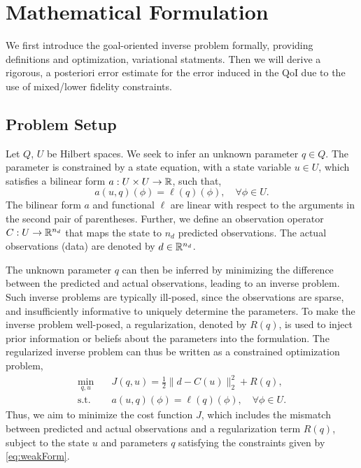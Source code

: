 \section{Mathematical Formulation}\label{sect:form}
%
We first introduce the goal-oriented inverse problem formally, providing definitions and optimization, variational statments. Then we will derive a rigorous, a posteriori error estimate for the error induced in the QoI due to the use of mixed/lower fidelity constraints.

\subsection{Problem Setup}  \label{sec:setup}
%
Let $Q$, $U$ be Hilbert spaces. We seek to infer an unknown parameter $q \in Q$. The parameter is constrained by a state equation, with a state variable $u \in U$, which satisfies a bilinear form $a:U \times U \to {\mathbb{R}}$, such that,
%
\begin{equation}
\label{eq:weakForm}
a(u,q)(\phi)=\ell(q)(\phi),\quad\forall\phi\in U.
\end{equation}
%
The bilinear form $a$ and functional $\ell$ are linear with respect to the arguments in the second pair of parentheses. Further, we define an observation operator $C:U\to{\mathbb{R}}^{n_d}$ that maps the state to $n_d$ predicted observations. The actual observations (data) are denoted by $d\in{\mathbb{R}}^{n_d}$.

The unknown parameter $q$ can then be inferred by minimizing the difference between the predicted and actual observations, leading to an inverse problem. Such inverse problems are typically ill-posed, since the observations are sparse, and insufficiently informative to uniquely determine the parameters. To make the inverse problem well-posed, a regularization, denoted by $R(q)$, is used to inject prior information or beliefs about the parameters into the formulation. The regularized inverse problem can thus be written as a constrained optimization problem,
%
\begin{subequations}
\label{eq:invOpt}
\begin{align}
\min\limits_{q,u} & \quad J(q,u)=\frac{1}{2}\|d-C(u)\|_2^2 + R(q), \label{eq:invOpt_obj} \\
\textrm{s.t. }& \quad a(u,q)(\phi)=\ell(q)(\phi),\quad\forall\phi\in U. \label{eq:invOpt_cons}
\end{align}
\end{subequations}
%
Thus, we aim to minimize the cost function $J$, which includes the mismatch between predicted and actual observations and a regularization term $R(q)$, subject to the state $u$ and parameters $q$ satisfying the constraints given by \cref{eq:weakForm}.

